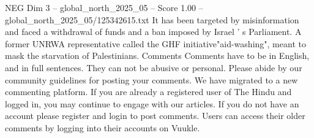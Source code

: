 \begin{textsample}{NEG Dim 3 – global\_north\_2025\_05 – Score 1.00 – global\_north\_2025\_05/125342615.txt}
It has been targeted by misinformation and faced a withdrawal of funds and a ban imposed by Israel ' s Parliament.
A former UNRWA representative called the GHF initiative"aid-washing", meant to mask the starvation of Palestinians.
Comments Comments have to be in English, and in full sentences.
They can not be abusive or personal.
Please abide by our community guidelines for posting your comments.
We have migrated to a new commenting platform.
If you are already a registered user of The Hindu and logged in, you may continue to engage with our articles.
If you do not have an account please register and login to post comments.
Users can access their older comments by logging into their accounts on Vuukle.

\end{textsample}
